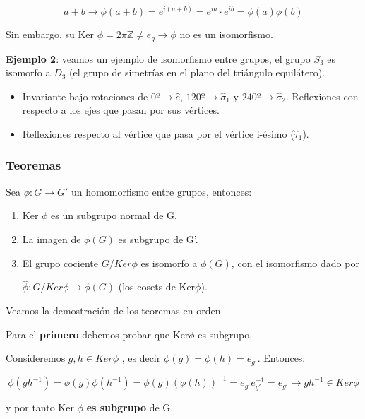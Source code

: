 \documentclass{article}
\begin{document}
$$a+b \longrightarrow \phi (a+b) =e^{i(a+b)}=e^{ia}\cdot e^{ib}=\phi(a)\phi (b)$$

Sin embargo, su Ker $\phi =2\pi \mathds{Z}\neq e_g \rightarrow \phi $ no es un isomorfismo.

\bigskip
\textbf{Ejemplo 2}: veamos un ejemplo de isomorfismo entre grupos, el grupo $S_3$ es isomorfo a $D_3$ (el grupo de simetrías en el plano del triángulo equilátero).

\begin{itemize}
\item Invariante bajo rotaciones de  $0º \rightarrow \hat{e}$, $120º \rightarrow \hat{\sigma}_1$ y $240º \rightarrow \hat{\sigma} _2$. Reflexiones con respecto a los ejes que pasan por sus vértices.

\item  Reflexiones respecto al vértice que pasa por el vértice i-ésimo ($\hat{\tau}_1$).
\end{itemize}

\subsubsection{Teoremas}

Sea $\phi : G\rightarrow G'$ un homomorfismo entre grupos, entonces:

\begin{enumerate}
\item Ker $\phi$ es un subgrupo normal de G.

\item La imagen de $\phi (G)$ es subgrupo de G'.

\item El grupo cociente $G/Ker\phi$ es isomorfo a $\phi (G)$, con el isomorfismo dado por

$\hat{\phi} : G/Ker\phi \rightarrow \phi (G)$ (los cosets de Ker$\phi$).

\end{enumerate}

Veamos la demostración de los teoremas en orden.

\bigskip
Para el \textbf{primero} debemos probar que Ker$\phi$ es subgrupo.

\smallskip
Consideremos $g,h\in Ker\phi $ , es decir $\phi (g) =\phi (h)=e_{g'}$. Entonces:

$$\phi (gh^{-1})=\phi (g)\phi (h^{-1})=\phi (g)(\phi(h))^{-1}=e_{g'}e_{g'}^{-1}=e_{g'} \rightarrow gh^{-1} \in Ker \phi $$

y por tanto Ker $\phi$ \textbf{es subgrupo} de G.
\smallskip
\end{document}
